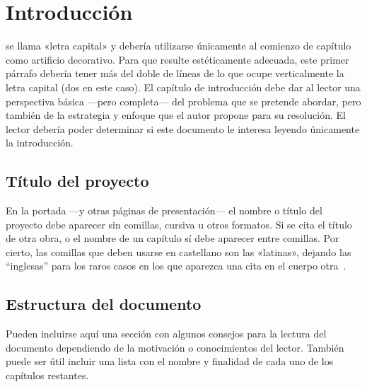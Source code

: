 \chapter{Introducción}
\label{chap:introduccion}

 se llama «letra capital» y debería utilizarse únicamente al
comienzo de capítulo como artificio decorativo. Para que resulte estéticamente
adecuada, este primer párrafo debería tener más del doble de líneas de lo que
ocupe verticalmente la letra capital (dos en este caso). El capítulo de
introducción debe dar al lector una perspectiva básica ---pero completa--- del
problema que se pretende abordar, pero también de la estrategia y enfoque que el
autor propone para su resolución. El lector debería poder determinar si este
documento le interesa leyendo únicamente la introducción.


\section{Título del proyecto}

En la portada ---y otras páginas de presentación--- el nombre o título del
proyecto debe aparecer sin comillas, cursiva u otros formatos. Si se cita el
título de otra obra, o el nombre de un capítulo sí debe aparecer entre
comillas. Por cierto, las comillas que deben usarse en castellano son las
«latinas», dejando las ``inglesas'' para los raros casos en los que aparezca una
cita en el cuerpo otra~\cite{sousa}.


\section{Estructura del documento}

Pueden incluirse aquí una sección con algunos consejos para la lectura del
documento dependiendo de la motivación o conocimientos del lector.  También
puede ser útil incluir una lista con el nombre y finalidad de cada uno de los
capítulos restantes.

\begin{definitionlist}
\end{definitionlist}
